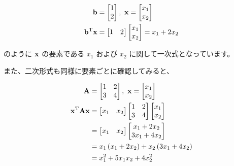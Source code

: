 \[
\begin{aligned}
{\bf b}
&=
\begin{bmatrix}
1 \\
2
\end{bmatrix},\
{\bf x} =
\begin{bmatrix}
x_{1} \\
x_{2}
\end{bmatrix}\\
{\bf b}^{\rm T}{\bf x}
&=
\begin{bmatrix}
1 & 2
\end{bmatrix}
\begin{bmatrix}
x_1 \\
x_2
\end{bmatrix}
= x_1 + 2x_2
\end{aligned}
\]


のように ${\bf x}$ の要素である $x_1$ および $x_2$ に関して一次式となっています。


また、二次形式も同様に要素ごとに確認してみると、


\[
\begin{aligned}
{\bf A} &=
\begin{bmatrix}
1 & 2 \\
3 & 4
\end{bmatrix},\
{\bf x} =
\begin{bmatrix}
x_{1} \\
x_{2}
\end{bmatrix}\\
{\bf x}^{\rm T}{\bf A}{\bf x}
&=
\begin{bmatrix}
x_1 & x_2
\end{bmatrix}
\begin{bmatrix}
1 & 2 \\
3 & 4
\end{bmatrix}
\begin{bmatrix}
x_1 \\
x_2
\end{bmatrix} \\
&=
\begin{bmatrix}
x_1 & x_2
\end{bmatrix}
\begin{bmatrix}
x_1 + 2x_2 \\
3x_1 + 4x_2
\end{bmatrix} \\
&=
x_1 \left( x_1 + 2x_2 \right) + x_2 \left( 3x_1 + 4x_2 \right) \\
&=
x^2_1 + 5x_1 x_2 + 4x_2^2
\end{aligned}
\]


